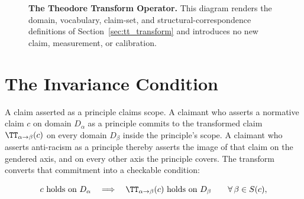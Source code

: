 \begin{figure}[htbp]
\centering
{}
\caption[The Theodore Transform operator]{\textbf{The Theodore Transform Operator.} This diagram renders the domain, vocabulary, claim-set, and structural-correspondence definitions of Section~\ref{sec:tt_transform} and introduces no new claim, measurement, or calibration.}
\label{fig:tt_operator}
\end{figure}

\section{The Invariance Condition}
\label{sec:tt_invariance}

A claim asserted as a principle claims scope. A claimant who asserts a normative claim $c$ on
domain $D_\alpha$ as a principle commits to the transformed claim
$\TT_{\alpha \to \beta}(c)$ on every domain $D_\beta$ inside the principle's scope. A
claimant who asserts anti-racism as a principle thereby asserts the image of that claim on the
gendered axis, and on every other axis the principle covers. The transform converts that commitment
into a checkable condition:

\begin{equation}\label{eq:tt.2-invariance}
c \text{ holds on } D_\alpha \quad\Longrightarrow\quad
\TT_{\alpha \to \beta}(c) \text{ holds on } D_\beta
\qquad \forall\, \beta \in S(c),
\end{equation}


